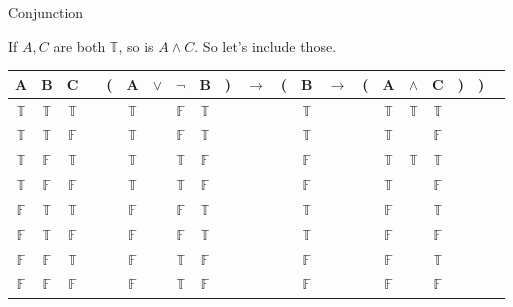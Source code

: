 \documentclass[
  ignorenonframetext,
]{beamer}
\renewcommand{\,}{\text{, }}
\def\True{\mathbb{T}}
\def\False{\mathbb{F}}
\begin{document}
\begin{frame}{Conjunction}
\protect\hypertarget{conjunction}{}

If \(A, C\) are both \(\True\), so is \(A \wedge C\). So let's include
those.

\begin{center}
\bigskip
\begin{tabular}{@{ }c@{ }@{ }c@{ }@{ }c | c@{ }@{}c@{}@{ }c@{ }@{ }c@{ }@{ }c@{ }@{ }c@{ }@{}c@{}@{ }c@{ }@{}c@{}@{ }c@{ }@{ }c@{ }@{}c@{}@{ }c@{ }@{ }c@{ }@{ }c@{ }@{}c@{}@{}c@{}@{ }c}
A & B & C &  & ( & A & $\vee$ & $\neg$ & B & ) & $\rightarrow$ & ( & B & $\rightarrow$ & ( & A & $\wedge$ & C & ) & ) & \\
\hline 
 $\True$ & $\True$ & $\True$ &  &  & $\True$ && $\False$ & $\True$ &  &&  & $\True$ &&  & $\True$ & $\True$ & $\True$ &  &  & \\
 $\True$ & $\True$ & $\False$ &  &  & $\True$ && $\False$ & $\True$ &  &&  & $\True$ &&  & $\True$ && $\False$ &  &  & \\
 $\True$ & $\False$ & $\True$ &  &  & $\True$ && $\True$ & $\False$ &  &&  & $\False$ &&  & $\True$ & $\True$ & $\True$ &  &  & \\
 $\True$ & $\False$ & $\False$ &  &  & $\True$ && $\True$ & $\False$ &  &&  & $\False$ &&  & $\True$ && $\False$ &  &  & \\
 $\False$ & $\True$ & $\True$ &  &  & $\False$ && $\False$ & $\True$ &  &&  & $\True$ &&  & $\False$ && $\True$ &  &  & \\
 $\False$ & $\True$ & $\False$ &  &  & $\False$ && $\False$ & $\True$ &  &&  & $\True$ &&  & $\False$ && $\False$ &  &  & \\
 $\False$ & $\False$ & $\True$ &  &  & $\False$ && $\True$ & $\False$ &  &&  & $\False$ &&  & $\False$ && $\True$ &  &  & \\
 $\False$ & $\False$ & $\False$ &  &  & $\False$ && $\True$ & $\False$ &  &&  & $\False$ &&  & $\False$ && $\False$ &  &  & \\
\end{tabular}
\bigskip
\end{center}

\end{frame}
\end{document}
